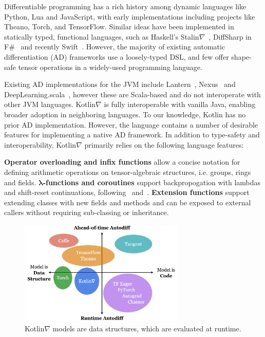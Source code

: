\documentclass[12pt,initial,twoside,maitrise]{dms}
\numberwithin{equation}{section}
\numberwithin{table}{chapter}
\numberwithin{figure}{chapter}
\begin{document}
Differentiable programming has a rich history among dynamic languages like Python, Lua and JavaScript, with early implementations including projects like Theano, Torch, and TensorFlow. Similar ideas have been implemented in statically typed, functional languages, such as Haskell's Stalin$\nabla$~\cite{pearlmutter2008using}, DiffSharp in F\#~\cite{baydin-diffsharp} and recently Swift~\cite{swift}. However, the majority of existing automatic differentiation (AD) frameworks use a loosely-typed DSL, and few offer shape-safe tensor operations in a widely-used programming language.

Existing AD implementations for the JVM include Lantern~\cite{DBLP:journals-corr-abs-1803-10228}, Nexus~\cite{chen2017typesafe} and DeepLearning.scala~\cite{dl4s}, however these are Scala-based and do not interoperate with other JVM languages. Kotlin$\nabla$ is fully interoperable with vanilla Java, enabling broader adoption in neighboring languages. To our knowledge, Kotlin has no prior AD implementation. However, the language contains a number of desirable features for implementing a native AD framework. In addition to type-safety and interoperability, Kotlin$\nabla$ primarily relies on the following language features:

\textbf{Operator overloading and infix functions} allow a concise notation for defining arithmetic operations on tensor-algebraic structures, i.e. groups, rings and fields.
\textbf{$\mathbf{\lambda}$-functions and coroutines} support backpropogation with lambdas and shift-reset continuations, following~\cite{pearlmutter2008reverse} and~\cite{DBLP:journals-corr-abs-1803-10228}.
\textbf{Extension functions} support extending classes with new fields and methods and can be exposed to external callers without requiring sub-classing or inheritance.

\begin{figure}
    \centering
    \includegraphics[width=0.70\textwidth]{kotlingrad_diagram.png}
    \caption{Kotlin$\nabla$ models are data structures, which are evaluated at runtime.}
    \label{fig:kotlingrad_digram}
\end{figure}
\end{document}
